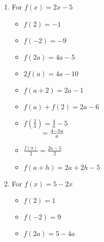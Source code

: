 \documentclass{ximera}
\begin{document}
\begin{enumerate}

\item For $f(x) = 2x-5$


\begin{itemize}

\item  $f(2) = -1$
\item  $f(-2) = -9$
\item  $f(2a) = 4a-5$

\end{itemize}

\begin{itemize}

\item  $2 f(a) = 4a-10$
\item $f(a+2) = 2a-1$
\item $f(a) + f(2) = 2a-6$

\end{itemize}


\begin{itemize}

\item  $f \left( \frac{2}{a} \right) = \frac{4}{a} - 5$ \\
$\hphantom{f \left( \frac{2}{a} \right)} = \frac{4-5a}{a}$

 

 

\item $\frac{f(a)}{2} =\frac{2a-5}{2}$

 

 


\item  $f(a + h) = 2a + 2h - 5$

\end{itemize}



\item For $f(x) = 5-2x$



\begin{itemize}

\item  $f(2) = 1$
\item  $f(-2) = 9$
\item  $f(2a) = 5-4a$

\end{itemize}


\begin{itemize}


\end{itemize}
\end{enumerate}
\end{document}
